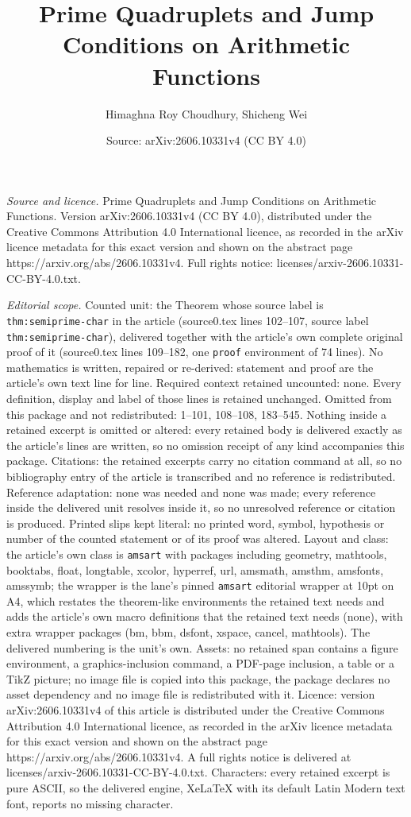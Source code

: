 \documentclass[10pt,a4paper]{amsart}
\title[Prime Quadruplets and Jump Conditions on Arithmetic Function]{Prime Quadruplets and Jump Conditions on Arithmetic Functions}
\author{Himaghna Roy Choudhury, Shicheng Wei}
\date{Source: arXiv:2606.10331v4 (CC BY 4.0)}
\begin{document}
\maketitle

\noindent\emph{Source and licence.} Prime Quadruplets and Jump Conditions on Arithmetic Functions. Version arXiv:2606.10331v4 (CC BY 4.0), distributed under the Creative Commons Attribution 4.0 International licence, as recorded in the arXiv licence metadata for this exact version and shown on the abstract page https://arxiv.org/abs/2606.10331v4. Full rights notice: licenses/arxiv-2606.10331-CC-BY-4.0.txt.\par\smallskip

\noindent\textit{Editorial scope.} Counted unit: the Theorem whose source label is \texttt{thm:semiprime-char} in the article (source0.tex lines 102--107, source label \texttt{thm:semiprime-char}), delivered together with the article's own complete original proof of it (source0.tex lines 109--182, one \texttt{proof} environment of 74 lines). No mathematics is written, repaired or re-derived: statement and proof are the article's own text line for line. Required context retained uncounted: none. Every definition, display and label of those lines is retained unchanged. Omitted from this package and not redistributed: 1--101, 108--108, 183--545. Nothing inside a retained excerpt is omitted or altered: every retained body is delivered exactly as the article's lines are written, so no omission receipt of any kind accompanies this package. Citations: the retained excerpts carry no citation command at all, so no bibliography entry of the article is transcribed and no reference is redistributed. Reference adaptation: none was needed and none was made; every reference inside the delivered unit resolves inside it, so no unresolved reference or citation is produced. Printed slips kept literal: no printed word, symbol, hypothesis or number of the counted statement or of its proof was altered. Layout and class: the article's own class is \texttt{amsart} with packages including geometry, mathtools, booktabs, float, longtable, xcolor, hyperref, url, amsmath, amsthm, amsfonts, amssymb; the wrapper is the lane's pinned \texttt{amsart} editorial wrapper at 10pt on A4, which restates the theorem-like environments the retained text needs and adds the article's own macro definitions that the retained text needs (none), with extra wrapper packages (bm, bbm, dsfont, xspace, cancel, mathtools). The delivered numbering is the unit's own. Assets: no retained span contains a figure environment, a graphics-inclusion command, a PDF-page inclusion, a table or a TikZ picture; no image file is copied into this package, the package declares no asset dependency and no image file is redistributed with it. Licence: version arXiv:2606.10331v4 of this article is distributed under the Creative Commons Attribution 4.0 International licence, as recorded in the arXiv licence metadata for this exact version and shown on the abstract page https://arxiv.org/abs/2606.10331v4. A full rights notice is delivered at licenses/arxiv-2606.10331-CC-BY-4.0.txt. Characters: every retained excerpt is pure ASCII, so the delivered engine, XeLaTeX with its default Latin Modern text font, reports no missing character.
\end{document}
